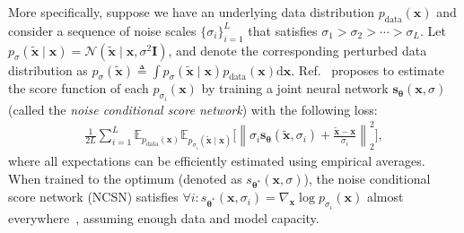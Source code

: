 \documentclass{article}
\newcommand{\mbb}[1]{\mathbb{#1}}
\newcommand{\mcal}{\mathcal}
\newcommand{\norm}[1]{\left\lVert#1\right\rVert}
\newcommand{\bfx}{\mathbf{x}}
\newcommand{\bfI}{\mathbf{I}}
\newcommand{\bftheta}{{\boldsymbol{\theta}}}
\newcommand{\bfs}{\mathbf{s}}
\begin{document}
More specifically, suppose we have an underlying data distribution $p_\text{data}(\bfx)$ and consider a sequence of noise scales $\{\sigma_i\}_{i=1}^L$ that satisfies $\sigma_1 > \sigma_2 > \cdots > \sigma_L$. Let $p_{\sigma}(\tilde{\bfx} \mid \bfx) = \mcal{N}(\tilde{\bfx} \mid \bfx, \sigma^2 \bfI)$, and denote the corresponding perturbed data distribution as $p_\sigma(\tilde{\bfx}) \triangleq \int p_\sigma(\tilde{\bfx} \mid \bfx) p_\text{data}(\bfx) \mathrm{d} \bfx$. Ref.~\cite{song2019generative} proposes to estimate the score function of each $p_{\sigma_i}(\bfx)$ by training a joint neural network $\bfs_\bftheta(\bfx, \sigma)$ (called the \emph{noise conditional score network}) with the following loss:
\begin{align}
  \frac{1}{2 L}   \sum_{i=1}^L \mbb{E}_{p_\text{data}(\bfx)} \mbb{E}_{p_{\sigma_i}(\tilde{\bfx}\mid\bfx)}\bigg[ \norm{\sigma_i \bfs_\bftheta(\tilde{\bfx}, \sigma_i) + \frac{\tilde{\bfx} - \bfx}{\sigma_i}}_2^2 \bigg] \label{eqn:ncsn_train},
\end{align}where all expectations can be efficiently estimated using empirical averages. When trained to the optimum (denoted as $s_{\bftheta^*}(\bfx, \sigma)$), the noise conditional score network (NCSN) satisfies $\forall i: s_{\bftheta^*}(\bfx, \sigma_i) = \nabla_\bfx \log p_{\sigma_i}(\bfx)$ almost everywhere~\cite{song2019generative}, assuming enough data and model capacity.
\end{document}
